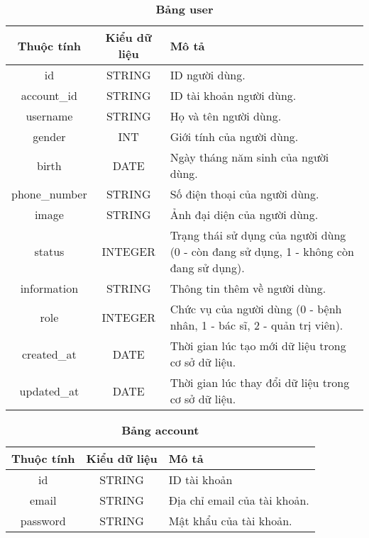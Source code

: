 \begin{table}[H]
  \caption{\bfseries \fontsize{12pt}{0pt}\selectfont Bảng user}
  \centering
  \begin{tabularx}{\textwidth}{|c|c|X|}
    \hline
    \textbf{Thuộc tính} & \textbf{Kiểu dữ liệu} & \textbf{Mô tả} \\
    \hline
    id & STRING & ID người dùng.  \\
    \hline
    account\_id & STRING & ID tài khoản người dùng. \\
    \hline
    username & STRING & Họ và tên người dùng. \\
    \hline
    gender & INT & Giới tính của người dùng. \\
    \hline
    birth & DATE & Ngày tháng năm sinh của người dùng. \\
    \hline
    phone\_number & STRING & Số điện thoại của người dùng. \\
    \hline
    image & STRING & Ảnh đại diện của người dùng. \\
    \hline
    status & INTEGER & Trạng thái sử dụng của người dùng (0 - còn đang sử dụng, 1 - không còn đang sử dụng). \\
    \hline
    information & STRING & Thông tin thêm về người dùng. \\
    \hline
    role & INTEGER & Chức vụ của người dùng (0 - bệnh nhân, 1 - bác sĩ, 2 - quản trị viên). \\
    \hline
    created\_at & DATE & Thời gian lúc tạo mới dữ liệu trong cơ sở dữ liệu. \\
    \hline
    updated\_at & DATE & Thời gian lúc thay đổi dữ liệu trong cơ sở dữ liệu. \\
    \hline
    
  \end{tabularx}
\end{table}


\begin{table}[H]
  \caption{\bfseries \fontsize{12pt}{0pt}\selectfont Bảng account}
  \centering
  \begin{tabularx}{\textwidth}{|c|c|X|}
    \hline
    \textbf{Thuộc tính} & \textbf{Kiểu dữ liệu} & \textbf{Mô tả} \\
    \hline
    id & STRING & ID tài khoản  \\
    \hline
    email & STRING & Địa chỉ email của tài khoản. \\
    \hline
    password & STRING & Mật khẩu của tài khoản. \\
    \hline
  \end{tabularx}
\end{table}

